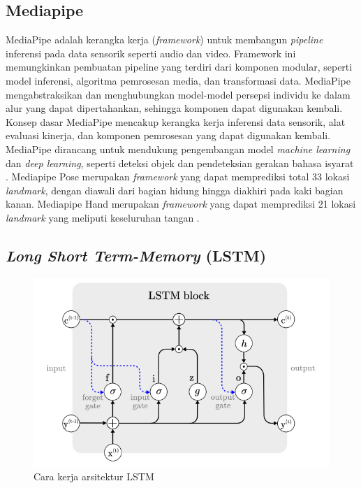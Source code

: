 \subsection{Mediapipe}
\label{subsec:mediapipe}
MediaPipe adalah kerangka kerja (\emph{framework}) untuk membangun \emph{pipeline} inferensi pada data sensorik seperti audio dan video. Framework ini memungkinkan pembuatan pipeline yang terdiri dari komponen modular, seperti model inferensi, algoritma pemrosesan media, dan transformasi data. MediaPipe mengabstraksikan dan menghubungkan model-model persepsi individu ke dalam alur yang dapat dipertahankan, sehingga komponen dapat digunakan kembali. Konsep dasar MediaPipe mencakup kerangka kerja inferensi data sensorik, alat evaluasi kinerja, dan komponen pemrosesan yang dapat digunakan kembali. MediaPipe dirancang untuk mendukung pengembangan model \emph{machine learning} dan \emph{deep learning}, seperti deteksi objek dan pendeteksian gerakan bahasa isyarat \cite{lugaresi2019:}. Mediapipe Pose merupakan \emph{framework} yang dapat memprediksi total 33 lokasi \emph{landmark}, dengan diawali dari bagian hidung hingga diakhiri pada kaki bagian kanan. Mediapipe Hand merupakan \emph{framework} yang dapat memprediksi 21 lokasi \emph{landmark} yang meliputi keseluruhan tangan \cite{googleMediapipe}.


\subsection{\emph{Long Short Term-Memory} (LSTM)}
\label{subsec:lstm}

\begin{figure}[ht]
    \centering

    \includegraphics[scale=0.5]{gambar/bab2-lstm-model.png}
 
    \caption{Cara kerja arsitektur LSTM}
    \label{fig:longshortterm}
\end{figure}

